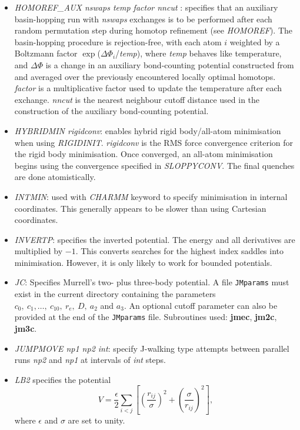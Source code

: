 \documentclass[12pt,a4paper,dvips]{article}
\begin{document}
\begin{itemize}
\item{\it HOMOREF\_AUX nswaps temp factor nncut \/}: specifies that an auxiliary basin-hopping run with {\it nswaps\/} exchanges is to be performed after each random permutation step during homotop refinement (see {\it HOMOREF\/}). The basin-hopping procedure is rejection-free, with each atom $i$ weighted by a Boltzmann factor $\exp$($\Delta\Phi_{i}$/{\it temp\/}), where {\it temp} behaves like temperature, and $\Delta \Phi$ is a change in an auxiliary bond-counting potential constructed from and averaged over the previously encountered locally optimal homotops. {\it factor \/} is a multiplicative factor used to update the temperature after each exchange. {\it nncut \/} is the nearest neighbour cutoff distance used in the construction of the auxiliary bond-counting potential.    

\item{\it HYBRIDMIN rigidconv\/}: enables hybrid rigid body/all-atom minimisation when using {\it RIGIDINIT}. {\it rigidconv} is
the RMS force convergence criterion for the rigid body minimisation. Once converged, an all-atom minimisation begins using the
convergence specified in {\it SLOPPYCONV}. The final quenches are done atomistically.

\item{\it INTMIN}: used with {\it CHARMM} keyword to specify minimisation in internal 
coordinates. This generally appears to be
slower than using Cartesian coordinates.

\item{\it INVERTP}: specifies the inverted potential. The energy and all derivatives
are multiplied by $-1$. 
This converts searches for the highest index saddles into minimisation. 
However, it is only likely to work for bounded potentials.

\item{\it JC}: Specifies Murrell's two- plus three-body
potential.\cite{murrellm90,murrellr90,alderzijmr91,eggenjlm92,fengjm93}
A file {\tt JMparams} must
exist in the current directory containing the parameters $c_0,\ c_1,\ldots,\ c_{10},\ r_e,\
D,\ a_2$ and $a_3$. An optional cutoff parameter can also be provided at the end of the
{\tt JMparams} file.
Subroutines used: {\bf jmec}, {\bf jm2c}, {\bf jm3c}.

\item {\it JUMPMOVE np1 np2 int\/}: specify J-walking type attempts between parallel runs {\it np2\/}
and {\it np1\/} at intervals of {\it int\/} steps.

\item {\it LB2} specifies the potential\cite{LB299a,LB299b,LB204}
\begin{equation}
V = \frac{\epsilon}{2} \sum_{i<j} \left[ \left(\frac{r_{ij}}{\sigma}\right)^2+
\left(\frac{\sigma}{r_{ij}}\right)^2 \right],
\end{equation}
where $\epsilon$ and $\sigma$ are set to unity.


\end{itemize}
\end{document}
